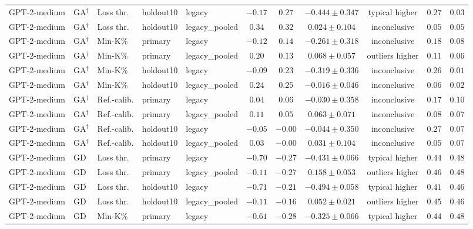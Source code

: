 \begin{table}[t]
\begin{tabular*}{\textwidth}{@{\extracolsep{\fill}}lllllcccccc@{}}
GPT-2-medium & GA$^{\dagger}$ & Loss thr. & holdout10 & legacy & $-0.17$ & $0.27$ & $-0.444 \pm 0.347$ & typical higher & $0.27$ & $0.03$ \\
GPT-2-medium & GA$^{\dagger}$ & Loss thr. & holdout10 & legacy\_pooled & $0.34$ & $0.32$ & $0.024 \pm 0.104$ & inconclusive & $0.05$ & $0.05$ \\
GPT-2-medium & GA$^{\dagger}$ & Min-K\% & primary & legacy & $-0.12$ & $0.14$ & $-0.261 \pm 0.318$ & inconclusive & $0.18$ & $0.08$ \\
GPT-2-medium & GA$^{\dagger}$ & Min-K\% & primary & legacy\_pooled & $0.20$ & $0.13$ & $0.068 \pm 0.057$ & outliers higher & $0.11$ & $0.06$ \\
GPT-2-medium & GA$^{\dagger}$ & Min-K\% & holdout10 & legacy & $-0.09$ & $0.23$ & $-0.319 \pm 0.336$ & inconclusive & $0.26$ & $0.01$ \\
GPT-2-medium & GA$^{\dagger}$ & Min-K\% & holdout10 & legacy\_pooled & $0.24$ & $0.25$ & $-0.016 \pm 0.046$ & inconclusive & $0.06$ & $0.02$ \\
GPT-2-medium & GA$^{\dagger}$ & Ref.-calib. & primary & legacy & $0.04$ & $0.06$ & $-0.030 \pm 0.358$ & inconclusive & $0.17$ & $0.10$ \\
GPT-2-medium & GA$^{\dagger}$ & Ref.-calib. & primary & legacy\_pooled & $0.11$ & $0.05$ & $0.063 \pm 0.071$ & inconclusive & $0.08$ & $0.07$ \\
GPT-2-medium & GA$^{\dagger}$ & Ref.-calib. & holdout10 & legacy & $-0.05$ & $-0.00$ & $-0.044 \pm 0.350$ & inconclusive & $0.27$ & $0.07$ \\
GPT-2-medium & GA$^{\dagger}$ & Ref.-calib. & holdout10 & legacy\_pooled & $0.03$ & $-0.00$ & $0.031 \pm 0.104$ & inconclusive & $0.05$ & $0.07$ \\
GPT-2-medium & GD & Loss thr. & primary & legacy & $-0.70$ & $-0.27$ & $-0.431 \pm 0.066$ & typical higher & $0.44$ & $0.48$ \\
GPT-2-medium & GD & Loss thr. & primary & legacy\_pooled & $-0.11$ & $-0.27$ & $0.158 \pm 0.053$ & outliers higher & $0.46$ & $0.48$ \\
GPT-2-medium & GD & Loss thr. & holdout10 & legacy & $-0.71$ & $-0.21$ & $-0.494 \pm 0.058$ & typical higher & $0.41$ & $0.46$ \\
GPT-2-medium & GD & Loss thr. & holdout10 & legacy\_pooled & $-0.11$ & $-0.16$ & $0.052 \pm 0.021$ & outliers higher & $0.45$ & $0.46$ \\
GPT-2-medium & GD & Min-K\% & primary & legacy & $-0.61$ & $-0.28$ & $-0.325 \pm 0.066$ & typical higher & $0.44$ & $0.48$ \\

\end{tabular*}
\end{table}
